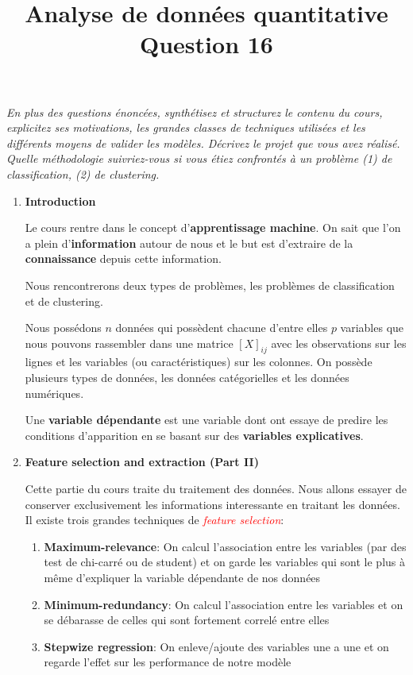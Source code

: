 \documentclass[a4paper, 11pt, onecolumn]{article}
\title{Analyse de données quantitative\\Question 16}
\date{}
\begin{document}
\maketitle

\textit{En plus des questions énoncées, synthétisez et structurez le contenu du cours, explicitez ses motivations, les grandes classes de techniques utilisées et les différents moyens de valider les modèles. Décrivez le projet que vous avez réalisé. Quelle méthodologie suivriez-vous si vous étiez confrontés à un problème (1) de classification, (2) de clustering.}

\begin{enumerate}

\item \textbf{Introduction}

Le cours rentre dans le concept d'\textbf{apprentissage machine}. On sait que l'on a plein d'\textbf{information} autour de nous et le but est d'extraire de la \textbf{connaissance} depuis cette information.

Nous rencontrerons deux types de problèmes, les problèmes de classification et de clustering.

Nous possédons $n$ données qui possèdent chacune d'entre elles $p$ variables que nous pouvons rassembler dans une matrice $[X]_{ij}$ avec les observations sur les lignes et les variables (ou caractéristiques) sur les colonnes. On possède plusieurs types de données, les données catégorielles et les données numériques. 

Une \textbf{variable dépendante} est une variable dont ont essaye de predire les conditions d'apparition en se basant sur des \textbf{variables explicatives}.

\item \textbf{Feature selection and extraction (Part II)}

  Cette partie du cours traite du traitement des données. Nous allons essayer de conserver exclusivement les informations interessante en traitant les données. Il existe trois grandes techniques de \textcolor{red}{\textit{feature selection}}:
\begin{enumerate}
\item \textbf{Maximum-relevance}: On calcul l'association entre les variables (par des test de chi-carré ou de student) et on garde les variables qui sont le plus à même d'expliquer la variable dépendante de nos données
\item \textbf{Minimum-redundancy}: On calcul l'association entre les variables et on se débarasse de celles qui sont fortement correlé entre elles
\item \textbf{Stepwize regression}: On enleve/ajoute des variables une a une et on regarde l'effet sur les performance de notre modèle
\end{enumerate}


\end{enumerate}
\end{document}
